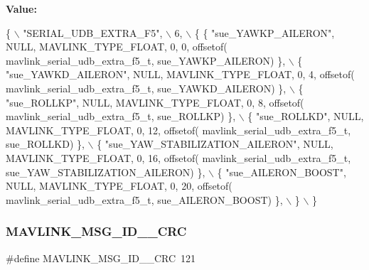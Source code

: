 {\bfseries Value\+:}
\begin{DoxyCode}
\{ \(\backslash\)
    \textcolor{stringliteral}{"SERIAL\_UDB\_EXTRA\_F5"}, \(\backslash\)
    6, \(\backslash\)
    \{  \{ \textcolor{stringliteral}{"sue\_YAWKP\_AILERON"}, NULL, MAVLINK_TYPE_FLOAT, 0, 0, offsetof(
      mavlink_serial_udb_extra_f5_t, sue\_YAWKP\_AILERON) \}, \(\backslash\)
         \{ \textcolor{stringliteral}{"sue\_YAWKD\_AILERON"}, NULL, MAVLINK_TYPE_FLOAT, 0, 4, offsetof(
      mavlink_serial_udb_extra_f5_t, sue\_YAWKD\_AILERON) \}, \(\backslash\)
         \{ \textcolor{stringliteral}{"sue\_ROLLKP"}, NULL, MAVLINK_TYPE_FLOAT, 0, 8, offsetof(
      mavlink_serial_udb_extra_f5_t, sue\_ROLLKP) \}, \(\backslash\)
         \{ \textcolor{stringliteral}{"sue\_ROLLKD"}, NULL, MAVLINK_TYPE_FLOAT, 0, 12, offsetof(
      mavlink_serial_udb_extra_f5_t, sue\_ROLLKD) \}, \(\backslash\)
         \{ \textcolor{stringliteral}{"sue\_YAW\_STABILIZATION\_AILERON"}, NULL, MAVLINK_TYPE_FLOAT, 0, 16, offsetof(
      mavlink_serial_udb_extra_f5_t, sue\_YAW\_STABILIZATION\_AILERON) \}, \(\backslash\)
         \{ \textcolor{stringliteral}{"sue\_AILERON\_BOOST"}, NULL, MAVLINK_TYPE_FLOAT, 0, 20, offsetof(
      mavlink_serial_udb_extra_f5_t, sue\_AILERON\_BOOST) \}, \(\backslash\)
         \} \(\backslash\)
\}
\end{DoxyCode}
\mbox{\label{mavlink__msg__serial__udb__extra__f5_8h_a1733f35307f9be83006eaad59329c881}} 
\subsubsection{M\+A\+V\+L\+I\+N\+K\+\_\+\+M\+S\+G\+\_\+\+I\+D\+\_\+\_\+\+C\+RC}
{\footnotesize\ttfamily \#define M\+A\+V\+L\+I\+N\+K\+\_\+\+M\+S\+G\+\_\+\+I\+D\+\_\+\_\+\+C\+RC~121}

\mbox{\label{mavlink__msg__serial__udb__extra__f5_8h_a744f95cdd5bc52b1bb6209b5e465b668}} 
